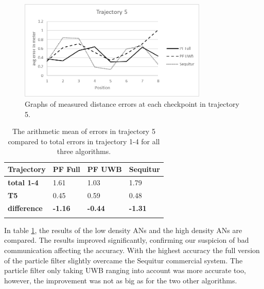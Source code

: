 \begin{figure}[th]
\centering
\includegraphics[width=0.8\textwidth]{Figures/trajectory5_results}
\decoRule
\caption[Positioning results trajectory 5]{Graphs of measured distance errors at each checkpoint in trajectory 5.}
\label{fig:trajectory5_results}
\end{figure}

\begin{table}
\caption{The arithmetic mean of errors in trajectory 5 compared to total errors in trajectory 1-4 for all three algorithms.}
\label{tab:arithmetic_errors_trajectory5}
\centering
\begin{tabular}{l l l l}
\toprule
\textbf{Trajectory} & \textbf{PF Full} & \textbf{PF UWB} & \textbf{Sequitur}\\
\midrule
\textbf{total 1-4} & 1.61 & 1.03 & 1.79\\
\textbf{T5} & 0.45 & 0.59 & 0.48\\
\midrule
\textbf{difference}  & \textbf{-1.16} & \textbf{-0.44} & \textbf{-1.31}\\
\bottomrule\\
\end{tabular}
\end{table}

In table \ref{tab:arithmetic_errors_trajectory5}, the results of the low density ANs and the high density ANs are compared. The results improved significantly, confirming our suspicion of bad communication affecting the accuracy. With the highest accuracy the full version of the particle filter slightly overcame the Sequitur commercial system. The particle filter only taking UWB ranging into account was more accurate too, however, the improvement was not as big as for the two other algorithms.


